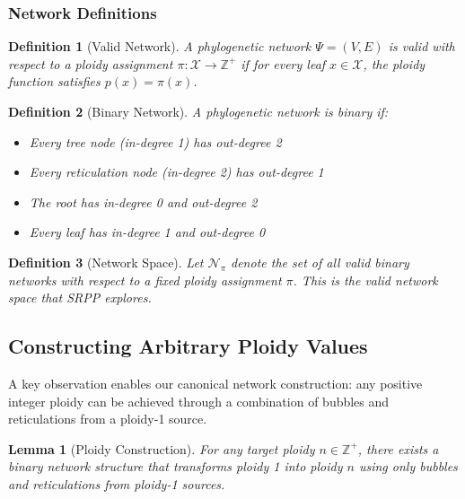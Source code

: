 \documentclass{article}
\newtheorem{definition}{\color{bluem}Definition}
\newtheorem{lemma}[theorem]{Lemma}
\begin{document}
\subsubsection{Network Definitions}

\begin{definition}[Valid Network]
A phylogenetic network $\Psi = (V, E)$ is \textit{valid} with respect to a ploidy assignment $\pi : \mathcal{X} \rightarrow \mathbb{Z}^+$ if for every leaf $x \in \mathcal{X}$, the ploidy function satisfies $p(x) = \pi(x)$.
\end{definition}

\begin{definition}[Binary Network]
A phylogenetic network is \textit{binary} if:
\begin{itemize}
    \item Every tree node (in-degree 1) has out-degree 2
    \item Every reticulation node (in-degree 2) has out-degree 1
    \item The root has in-degree 0 and out-degree 2
    \item Every leaf has in-degree 1 and out-degree 0
\end{itemize}
\end{definition}

\begin{definition}[Network Space]
Let $\mathcal{N}_\pi$ denote the set of all valid binary networks with respect to a fixed ploidy assignment $\pi$. This is the \textit{valid network space} that SRPP explores.
\end{definition}

\subsection{Constructing Arbitrary Ploidy Values}

A key observation enables our canonical network construction: any positive integer ploidy can be achieved through a combination of bubbles and reticulations from a ploidy-1 source.

\begin{lemma}[Ploidy Construction]\label{lem:ploidy-construction}
For any target ploidy $n \in \mathbb{Z}^+$, there exists a binary network structure that transforms ploidy 1 into ploidy $n$ using only bubbles and reticulations from ploidy-1 sources.
\end{lemma}
\end{document}
